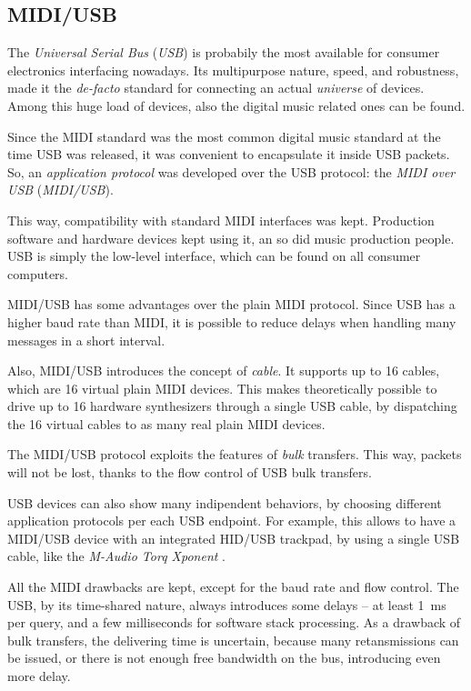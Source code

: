 \documentclass[a4paper,10pt]{article}
\begin{document}
\begin{multicols}{2}
\subsection{MIDI/USB}

The \emph{Universal Serial Bus} (\emph{USB}) \cite{usb_docs} is probabily the
most available for consumer electronics interfacing nowadays. Its multipurpose
nature, speed, and robustness, made it the \emph{de-facto} standard for
connecting an actual \emph{universe} of devices. Among this huge load of
devices, also the digital music related ones can be found.

Since the MIDI standard was the most common digital music standard at the time
USB was released, it was convenient to encapsulate it inside USB packets.
So, an \emph{application protocol} was developed over the USB protocol: the
\emph{MIDI over USB} (\emph{MIDI/USB}).

This way, compatibility with standard MIDI interfaces was kept. Production
software and hardware devices kept using it, an so did music production
people. USB is simply the low-level interface, which can be found on all
consumer computers.

MIDI/USB has some advantages over the plain MIDI protocol. Since USB has a
higher baud rate than MIDI, it is possible to reduce delays when handling
many messages in a short interval.

Also, MIDI/USB introduces the concept of \emph{cable}. It supports up to 16
cables, which are 16 virtual plain MIDI devices. This makes theoretically
possible to drive up to 16 hardware synthesizers through a single USB cable,
by dispatching the 16 virtual cables to as many real plain MIDI devices.

The MIDI/USB protocol exploits the features of \emph{bulk} transfers. This
way, packets will not be lost, thanks to the flow control of USB bulk
transfers.

USB devices can also show many indipendent behaviors, by choosing different
application protocols per each USB endpoint. For example, this allows to have
a MIDI/USB device with an integrated HID/USB trackpad,
by using a single USB cable, like the \emph{M-Audio Torq Xponent}
\cite{maudio_xponent}.

All the MIDI drawbacks are kept, except for the baud rate and flow control.
The USB, by its time-shared nature, always introduces some delays -- at
least 1~ms per query, and a few milliseconds for software stack processing.
As a drawback of bulk transfers, the delivering time is uncertain, because
many retansmissions can be issued, or there is not enough free bandwidth on
the bus, introducing even more delay.



\end{multicols}
\end{document}
